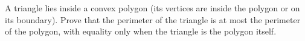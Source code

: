 A triangle lies inside a convex polygon (its vertices are inside the polygon or on its boundary). Prove that the perimeter of the triangle is at most the perimeter of the polygon, with equality only when the triangle is the polygon itself.
